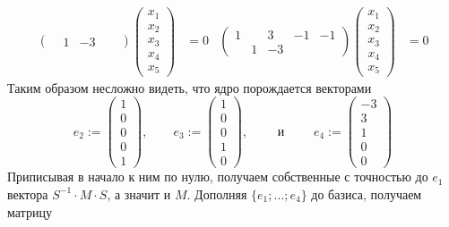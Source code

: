 \documentclass[12pt,a4paper]{article}
\begin{document}
\begin{problem*}
\begin{enumerate}
\begin{align*}
\begin{pmatrix}
                        & 1& -3&&
                    \end{pmatrix}
                    \begin{pmatrix}
                        x_1\\x_2\\x_3\\x_4\\x_5
                    \end{pmatrix}
                    &= 0&
                    \begin{pmatrix}
                        1&& 3& -1& -1\\
                        & 1& -3&&
                    \end{pmatrix}
                    \begin{pmatrix}
                        x_1\\x_2\\x_3\\x_4\\x_5
                    \end{pmatrix}
                    &= 0
                \end{align*}
                Таким образом несложно видеть, что ядро порождается векторами
                \[
                    e_2 :=
                    \begin{pmatrix}
                        1\\0\\0\\0\\1
                    \end{pmatrix},
                    \qquad
                    e_3 :=
                    \begin{pmatrix}
                        1\\0\\0\\1\\0
                    \end{pmatrix},
                    \qquad \text{ и } \qquad
                    e_4 :=
                    \begin{pmatrix}
                        -3\\3\\1\\0\\0
                    \end{pmatrix}
                \]
                Приписывая в начало к ним по нулю, получаем собственные с точностью до $e_1$ вектора $S^{-1} \cdot M \cdot S$, а значит и $M$. Дополняя $\{e_1; \dots; e_4\}$ до базиса, получаем матрицу

\end{enumerate}
\end{problem*}
\end{document}
